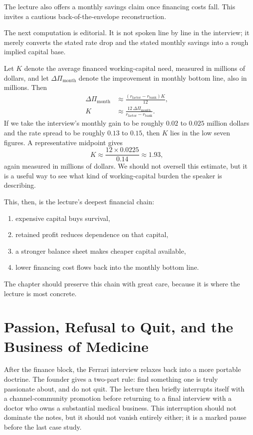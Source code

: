 The lecture also offers a monthly savings claim once financing costs fall. This invites a cautious back-of-the-envelope reconstruction.

\begin{remark}
The next computation is editorial. It is not spoken line by line in the interview; it merely converts the stated rate drop and the stated monthly savings into a rough implied capital base.
\end{remark}

Let \(K\) denote the average financed working-capital need, measured in millions of dollars, and let \(\Delta \Pi_{\text{month}}\) denote the improvement in monthly bottom line, also in millions. Then
\begin{align}
\Delta \Pi_{\text{month}} &\approx \frac{(r_{\text{factor}}-r_{\text{bank}})K}{12},\\
K &\approx \frac{12\,\Delta \Pi_{\text{month}}}{r_{\text{factor}}-r_{\text{bank}}}.
\end{align}
If we take the interview's monthly gain to be roughly \(0.02\) to \(0.025\) million dollars and the rate spread to be roughly \(0.13\) to \(0.15\), then \(K\) lies in the low seven figures. A representative midpoint gives
\begin{equation}
K \approx \frac{12\times 0.0225}{0.14}\approx 1.93,
\end{equation}
again measured in millions of dollars. We should not oversell this estimate, but it is a useful way to see what kind of working-capital burden the speaker is describing.

This, then, is the lecture's deepest financial chain:
\begin{enumerate}
\item expensive capital buys survival,
\item retained profit reduces dependence on that capital,
\item a stronger balance sheet makes cheaper capital available,
\item lower financing cost flows back into the monthly bottom line.
\end{enumerate}
The chapter should preserve this chain with great care, because it is where the lecture is most concrete.

\section{Passion, Refusal to Quit, and the Business of Medicine}

After the finance block, the Ferrari interview relaxes back into a more portable doctrine. The founder gives a two-part rule: find something one is truly passionate about, and do not quit. The lecture then briefly interrupts itself with a channel-community promotion before returning to a final interview with a doctor who owns a substantial medical business. This interruption should not dominate the notes, but it should not vanish entirely either; it is a marked pause before the last case study.

